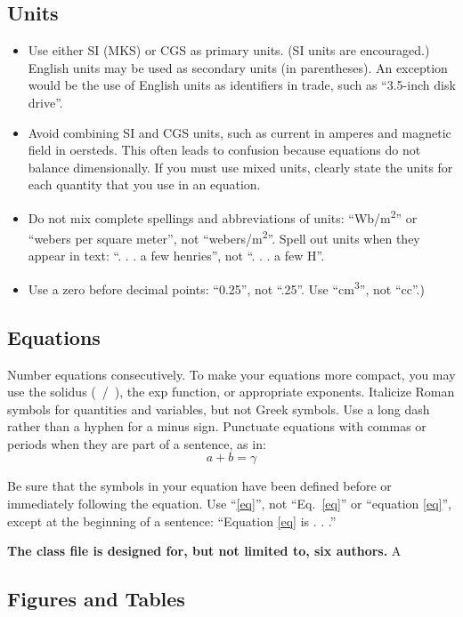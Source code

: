 \documentclass[conference]{IEEEtran}
\begin{document}
\subsection{Units}
\begin{itemize}
\item Use either SI (MKS) or CGS as primary units. (SI units are encouraged.) English units may be used as secondary units (in parentheses). An exception would be the use of English units as identifiers in trade, such as ``3.5-inch disk drive''.
\item Avoid combining SI and CGS units, such as current in amperes and magnetic field in oersteds. This often leads to confusion because equations do not balance dimensionally. If you must use mixed units, clearly state the units for each quantity that you use in an equation.
\item Do not mix complete spellings and abbreviations of units: ``Wb/m\textsuperscript{2}'' or ``webers per square meter'', not ``webers/m\textsuperscript{2}''. Spell out units when they appear in text: ``. . . a few henries'', not ``. . . a few H''.
\item Use a zero before decimal points: ``0.25'', not ``.25''. Use ``cm\textsuperscript{3}'', not ``cc''.)
\end{itemize}

\subsection{Equations}
Number equations consecutively. To make your 
equations more compact, you may use the solidus (~/~), the exp function, or 
appropriate exponents. Italicize Roman symbols for quantities and variables, 
but not Greek symbols. Use a long dash rather than a hyphen for a minus 
sign. Punctuate equations with commas or periods when they are part of a 
sentence, as in:
\begin{equation}
a+b=\gamma\label{eq}
\end{equation}

Be sure that the 
symbols in your equation have been defined before or immediately following 
the equation. Use ``\eqref{eq}'', not ``Eq.~\eqref{eq}'' or ``equation \eqref{eq}'', except at 
the beginning of a sentence: ``Equation \eqref{eq} is . . .''


\textbf{The class file is designed for, but not limited to, six authors.} A 

\subsection{Figures and Tables}
\end{document}
